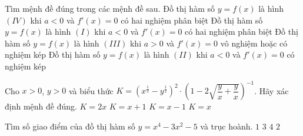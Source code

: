 \begin{ex}
\begin{center}
\begin{multicols}{4}
\end{multicols}
\end{center}
Tìm mệnh đề đúng trong các mệnh đề sau.
\choice
{Đồ thị hàm số $y=f(x)$ là hình $(IV)$ khi $a<0$ và $f'(x)=0$ có hai nghiệm phân biệt}
{Đồ thị hàm số $y=f(x)$ là hình $(I)$ khi $a<0$ và $f'(x)=0$ có hai nghiệm phân biệt}
{\True Đồ thị hàm số $y=f(x)$ là hình $(III)$ khi $a>0$ và $f'(x)=0$ vô nghiệm hoặc có nghiệm kép}
{Đồ thị hàm số $y=f(x)$ là hình $(II)$ khi $a<0$ và $f'(x)=0$ có nghiệm kép}
\end{ex}
\begin{ex}%
Cho $x>0$, $y>0$ và biểu thức $K=\left(x^{\frac{1}{2}}-y^{\frac{1}{2}}\right)^{2}\cdot\left(1-2\sqrt{\dfrac{y}{x}+\dfrac{y}{x}}\right)^{-1}$. Hãy xác định mệnh đề đúng.
\choice
{$K=2x$}
{$K=x+1$}
{$K=x-1$}
{\True $K=x$}
\end{ex}
\begin{ex}%
Tìm số giao điểm của đồ thị hàm số $y=x^{4}-3x^{2}-5$ và trục hoành.
\choice
{$1$}
{$3$}
{$4$}
{\True $2$}
\end{ex}
